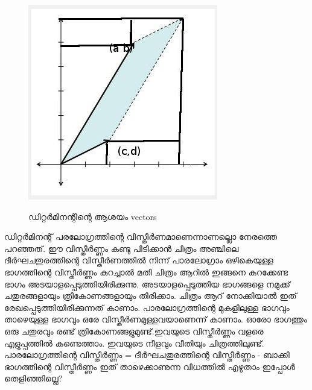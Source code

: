 \documentclass[10pt,a4paper]{report}
\begin{document}
    \begin{figure}[H]
  \center
\includegraphics[scale=.5]{images/m5}
\label{mat5}
\caption{ ഡിറ്റർമിനന്റിന്റെ  ആശയം vectors }
\end{figure}
     ഡിറ്റർമിനന്റ് പരലോഗ്രത്തിന്റെ വിസ്തീർണമാണെന്നാണല്ലൊ നേരത്തെ പറഞ്ഞത്. ഈ വിസ്തീർണ്ണം കണ്ടു പിടിക്കാൻ ചിത്രം അഞ്ചിലെ ദീർഘചതുരത്തിന്റെ വിസ്തീർണത്തിൽ നിന്ന് പാരലോഗ്രാം ഒഴികെയുള്ള ഭാഗത്തിന്റെ വിസ്തീർണ്ണം കുറച്ചാൽ മതി ചിത്രം ആറിൽ ഇങ്ങനെ കുറക്കേണ്ട ഭാഗം അടയാളപ്പെടുത്തിയിരിക്കുന്നു. അടയാളപ്പെടുത്തിയ ഭാഗങ്ങളെ നമുക്ക് ചതുരങ്ങളായും ത്രികോണങ്ങളായും തിരിക്കാം. ചിത്രം ആറ് നോക്കിയാൽ ഇത് രേഖപ്പെടുത്തിയിരിക്കുന്നത് കാണാം. പാരലോഗ്രത്തിന്റെ മുകളിലുള്ള ഭാഗവും താഴെയുള്ള ഭാഗവും ഒരേ വിസ്തീർണമുള്ളവയാണെന്ന് കാണാം. ഓരോ ഭാഗത്തും ഒരു ചതുരവും രണ്ട് ത്രികോണങ്ങളുമുണ്ട്.ഇവയുടെ വിസ്തീർണ്ണം വളരെ എളുപ്പത്തിൽ കണ്ടെത്താം. ഇവയുടെ നീളവും വീതിയും ചിത്രത്തിലുണ്ട്. പാരലോഗ്രത്തിന്റെ വിസ്തീർണ്ണം = ദീർഘചതുരത്തിന്റെ വിസ്തീർണ്ണം - ബാക്കി ഭാഗത്തിന്റെ വിസ്തീർണ്ണം ഇത് താഴെക്കാണുന്ന വിധത്തിൽ എഴുതാം ഇപ്പോൾ തെളിഞ്ഞില്ലെ? 
     
\end{document}
